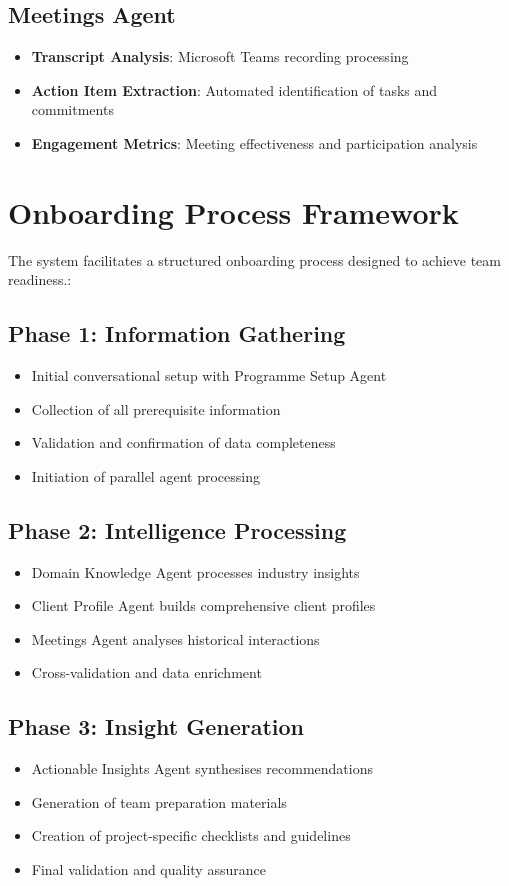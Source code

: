 \documentclass{article}
\begin{document}
\subsection{Meetings Agent}
\begin{itemize}
    \item \textbf{Transcript Analysis}: Microsoft Teams recording processing
    \item \textbf{Action Item Extraction}: Automated identification of tasks and commitments
    \item \textbf{Engagement Metrics}: Meeting effectiveness and participation analysis
\end{itemize}

\section{Onboarding Process Framework}
The system facilitates a structured onboarding process designed to achieve team readiness.:

\subsection{Phase 1: Information Gathering}
\begin{itemize}
    \item Initial conversational setup with Programme Setup Agent
    \item Collection of all prerequisite information
    \item Validation and confirmation of data completeness
    \item Initiation of parallel agent processing
\end{itemize}

\subsection{Phase 2: Intelligence Processing}
\begin{itemize}
    \item Domain Knowledge Agent processes industry insights
    \item Client Profile Agent builds comprehensive client profiles
    \item Meetings Agent analyses historical interactions
    \item Cross-validation and data enrichment
\end{itemize}

\subsection{Phase 3: Insight Generation}
\begin{itemize}
    \item Actionable Insights Agent synthesises recommendations
    \item Generation of team preparation materials
    \item Creation of project-specific checklists and guidelines
    \item Final validation and quality assurance
\end{itemize}
\end{document}
